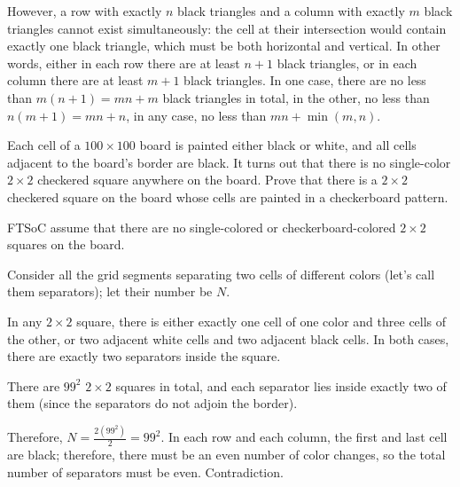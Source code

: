 However, a row with exactly $n$ black triangles and a column with exactly $m$ black triangles cannot exist simultaneously: the cell at their intersection would contain exactly one black triangle, which must be both horizontal and vertical. In other words, either in each row there are at least $n+1$ black triangles, or in each column there are at least $m+1$ black triangles. In one case, there are no less than $m(n+1)=mn+m$ black triangles in total, in the other, no less than $n(m+1)=mn+n$, in any case, no less than $mn+\min(m,n)$.

\begin{example} 
    Each cell of a $100\times 100$ board is painted either black or white, and all cells adjacent to the board's border are black. It turns out that there is no single-color $2\times 2$ checkered square anywhere on the board. Prove that there is a $2\times 2$ checkered square on the board whose cells are painted in a checkerboard pattern.
\end{example}

FTSoC assume that there are no single-colored or checkerboard-colored $2\times 2$ squares on the board.

Consider all the grid segments separating two cells of different colors (let's call them separators); let their number be $N$.

In any $2\times 2$ square, there is either exactly one cell of one color and three cells of the other, or two adjacent white cells and two adjacent black cells. In both cases, there are exactly two separators inside the square.

There are $99^2$ $2\times 2$ squares in total, and each separator lies inside exactly two of them (since the separators do not adjoin the border).

Therefore, $N = \frac{2(99^2)}{2} = 99^2$. In each row and each column, the first and last cell are black; therefore, there must be an even number of color changes, so the total number of separators must be even. Contradiction.

